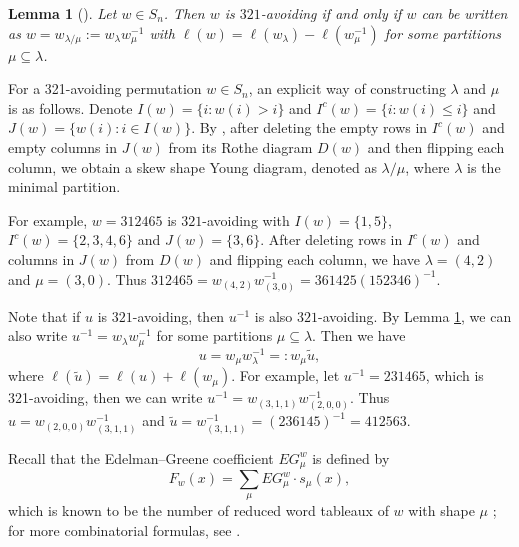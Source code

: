 \documentclass[12pt,reqno]{amsart}
\numberwithin{equation}{section}
\newtheorem{lemma}[theorem]{Lemma}
\theoremstyle{definition}
\begin{document}
\begin{lemma}[{\cite[Section 2]{BJS93}}]
\label{skewshape}
Let $w\in S_n$. Then $w$ is  $321$-avoiding if and only if $w$ can be written as $w=w_{\lambda/\mu}:=w_{\lambda}w^{-1}_{\mu}$ with $\ell(w)=\ell(w_\lambda)-\ell(w_\mu^{-1})$ for some partitions $\mu\subseteq\lambda$. 
\end{lemma}

For a 321-avoiding permutation $w\in S_n$, an explicit way of constructing $\lambda$ and $\mu$ is as follows. 
Denote $I(w)=\{i:w(i)>i\}$ and $I^c(w)=\{i:w(i)\leq i\}$ and $J(w)=\{w(i):i\in I(w)\}$. By \cite{BJS93}, after deleting the empty rows in $I^c(w)$ and empty columns in $J(w)$ from its Rothe diagram $D(w)$ and then flipping each column, we obtain a skew shape Young diagram, denoted as $\lambda/\mu$, where $\lambda$ is the minimal partition. 

For example, $w=312465$ is $321$-avoiding with $I(w)=\{1,5\}$, $I^c(w)=\{2,3,4,6\}$ and $J(w)=\{3,6\}$. After deleting rows in $I^c(w)$ and columns in $J(w)$ from $D(w)$ and flipping each column, we have $\lambda=(4,2)$ and $\mu=(3,0)$. Thus $312465=w_{(4,2)}w^{-1}_{(3,0)}=361425(152346)^{-1}$.


Note that if $u$ is $321$-avoiding, then $u^{-1}$ is  also $321$-avoiding. By Lemma \ref{skewshape}, we can also write $u^{-1}=w_{\lambda}w_{\mu}^{-1}$ for some partitions $\mu\subseteq \lambda$. 
Then we have 
\begin{equation}\label{uu}
u=w_{\mu}w^{-1}_{\lambda}=:w_{\mu}\tilde{u}, 
\end{equation}
 where $\ell(\tilde{u})=\ell(u)+\ell(w_{\mu})$.
For example, let $u^{-1}=231465$, which is  321-avoiding, then we can write $u^{-1}=w_{(3,1,1)}w^{-1}_{(2,0,0)}$. Thus
$u=w_{(2,0,0)}w^{-1}_{(3,1,1)}$ and $\tilde{u}=w^{-1}_{(3,1,1)}=(236145)^{-1}=412563$.






Recall that the Edelman--Greene coefficient $EG^w_{\mu}$ is defined by
 $$F_{w}(x)=\sum_{\mu}EG^w_{\mu}\cdot s_{\mu}(x),$$
 which is known to be the number of reduced word tableaux of $w$ with shape $\mu$ \cite{EG}; for more combinatorial formulas, see \cite{LLS18,FGS}.
\end{document}
